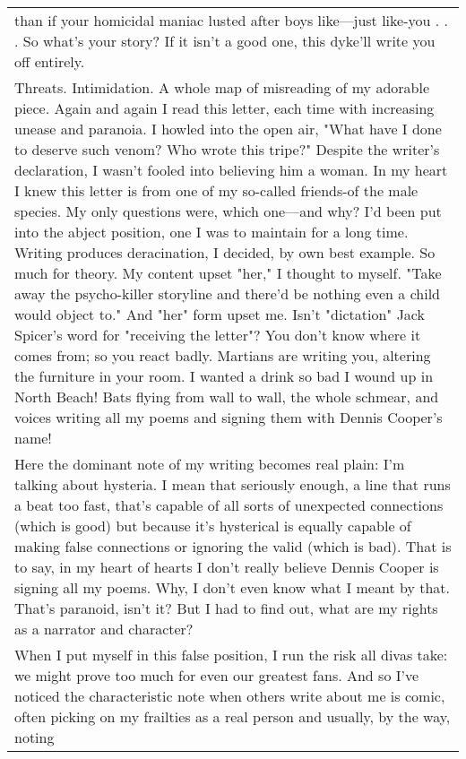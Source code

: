 \begin{longtable}[]{@{}l@{}}
\begin{minipage}[t]{0.97\columnwidth}
than if your homicidal maniac lusted after boys like---just like-you . .
. So what's your story? If it isn't a good one, this dyke'll write you
off entirely.\strut
\end{minipage}\tabularnewline
\begin{minipage}[t]{0.97\columnwidth}\raggedright
Threats. Intimidation. A whole map of misreading of my adorable piece.
Again and again I read this letter, each time with increasing unease and
paranoia. I howled into the open air, "What have I done to deserve such
venom? Who wrote this tripe?" Despite the writer's declaration, I wasn't
fooled into believing him a woman. In my heart I knew this letter is
from one of my so-called friends-of the male species. My only questions
were, which one---and why? I'd been put into the abject position, one I
was to maintain for a long time. Writing produces deracination, I
decided, by own best example. So much for theory. My content upset
"her," I thought to myself. "Take away the psycho-killer storyline and
there'd be nothing even a child would object to." And "her" form upset
me. Isn't "dictation" Jack Spicer's word for "receiving the letter"? You
don't know where it comes from; so you react badly. Martians are writing
you, altering the furniture in your room. I wanted a drink so bad I
wound up in North Beach! Bats flying from wall to wall, the whole
schmear, and voices writing all my poems and signing them with Dennis
Cooper's name!\strut
\end{minipage}\tabularnewline
\begin{minipage}[t]{0.97\columnwidth}\raggedright
Here the dominant note of my writing becomes real plain: I'm talking
about hysteria. I mean that seriously enough, a line that runs a beat
too fast, that's capable of all sorts of unexpected connections (which
is good) but because it's hysterical is equally capable of making false
connections or ignoring the valid (which is bad). That is to say, in my
heart of hearts I don't really believe Dennis Cooper is signing all my
poems. Why, I don't even know what I meant by that. That's paranoid,
isn't it? But I had to find out, what are my rights as a narrator and
character?\strut
\end{minipage}\tabularnewline
\begin{minipage}[t]{0.97\columnwidth}\raggedright
When I put myself in this false position, I run the risk all divas take:
we might prove too much for even our greatest fans. And so I've noticed
the characteristic note when others write about me is comic, often
picking on my frailties as a real person and usually, by the way, noting

\end{minipage}
\end{longtable}
